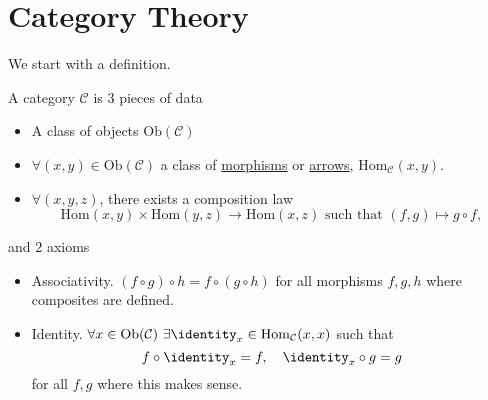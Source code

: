 \section{Category Theory}
We start with a definition.
\begin{definition}[Category]
	A category \(\mathcal{C} \) is \(3\) pieces of data
	\begin{itemize}
		\item A class of objects \(\mathrm{Ob}(\mathcal{C})\)
		\item \(\forall (x, y)\in\mathrm{Ob} (\mathcal{C} )\) a class of \underline{morphisms} or \underline{arrows}, \(\mathrm{Hom}_{\mathcal{C}}(x, y)\).
		\item \(\forall (x, y, z)\), there exists a composition law
		      \[
			      \mathrm{Hom} (x, y)\times \mathrm{Hom}(y, z)\to \mathrm{Hom}(x, z) \text{ such that }(f, g)\mapsto g\circ f,
		      \]
	\end{itemize}
	and \(2\) axioms
	\begin{itemize}
		\item Associativity. \((f\circ g)\circ h = f\circ (g\circ h)\) for all morphisms \(f, g, h\) where composites are defined.
		\item Identity. \(\forall x\in\mathrm{Ob}(\mathcal{C})\ \exists \identity_{x}\in\mathrm{Hom}_{\mathcal{C}}(x, x)\) such that
		      \[
			      f\circ \identity_{x} = f,\quad \identity_{x} \circ g = g
		      \]
		      for all \(f, g\) where this makes sense.
	\end{itemize}
\end{definition}

